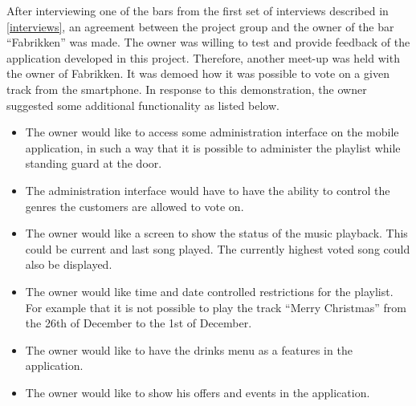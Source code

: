After interviewing one of the bars from the first set of interviews described in \cref{interviews}, an agreement between the project group and the owner of the bar \enquote{Fabrikken} was made. The owner was willing to test and provide feedback of the application developed in this project. Therefore, another meet-up was held with the owner of Fabrikken. It was demoed how it was possible to vote on a given track from the smartphone. In response to this demonstration, the owner suggested some additional functionality as listed below.

\begin{itemize}
    \item{The owner would like to access some administration interface on the mobile application, in such a way that it is possible to administer the playlist while standing guard at the door.}
    \item{The administration interface would have to have the ability to control the genres the customers are allowed to vote on.}
    \item{The owner would like a screen to show the status of the music
        playback. This could be current and last song played. The
        currently highest voted song could also be displayed.}
    \item{The owner would like time and date controlled restrictions
        for the playlist. For example that it is not possible to play
        the track
        \enquote{Merry Christmas} from the 26th of December to the 1st
      of December.}
    \item {The owner would like to have the drinks menu as a features in the application.}
    \item{The owner would like to show his offers and events in the application.}
\end{itemize}
